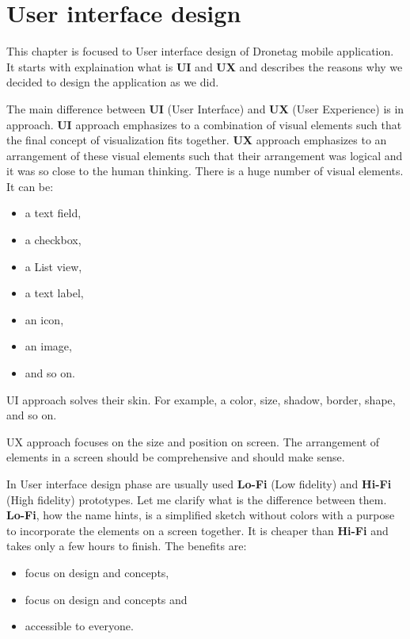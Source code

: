 \chapter{User interface design}\label{ch:user-interface-design}
This chapter is focused to User interface design of Dronetag mobile application.
It starts with explaination what is \textbf{UI} and \textbf{UX} and describes the reasons why we decided to design the application as we did.

The main difference between \textbf{UI} (User Interface) and \textbf{UX} (User Experience) is in approach.
\textbf{UI} approach emphasizes to a combination of visual elements such that the final concept of visualization fits together.
\textbf{UX} approach emphasizes to an arrangement of these visual elements such that their arrangement was logical and it was so close to the human thinking.
There is a huge number of visual elements.
It can be:
\begin{itemize}
    \item a text field,
    \item a checkbox,
    \item a List view,
    \item a text label,
    \item an icon,
    \item an image,
    \item and so on.
\end{itemize}

UI approach solves their skin.
For example, a color, size, shadow, border, shape, and so on.

UX approach focuses on the size and position on screen.
The arrangement of elements in a screen should be comprehensive and should make sense.

In User interface design phase are usually used \textbf{Lo-Fi} (Low fidelity) and \textbf{Hi-Fi} (High fidelity) prototypes.
Let me clarify what is the difference between them.
\textbf{Lo-Fi}, how the name hints, is a simplified sketch without colors with a purpose to incorporate the elements on a screen together.
It is cheaper than \textbf{Hi-Fi} and takes only a few hours to finish.
The benefits are:
\begin{itemize}
    \item focus on design and concepts,
    \item focus on design and concepts and
    \item accessible to everyone.\cite{hiFiLoFiPrototypeArticle}
\end{itemize}

